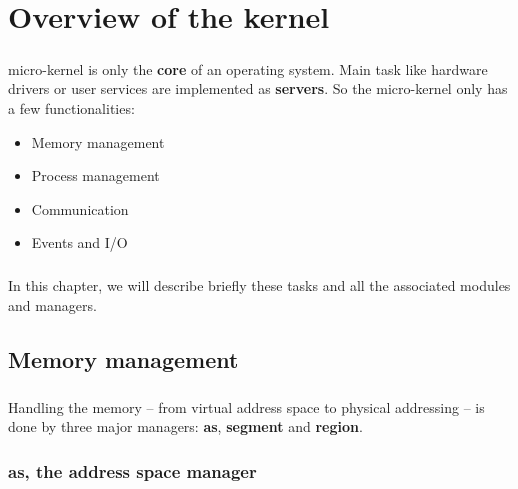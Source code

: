 
%
%

\chapter{Overview of the kernel}

\newpage

\paragraph{}
\kaneton micro-kernel is only the \textbf{core} of an operating system. Main task like hardware drivers or user services are implemented as \textbf{servers}. So the micro-kernel only has a few functionalities:\\

\begin{itemize}
\item Memory management
\item Process management
\item Communication
\item Events and I/O
\end{itemize}

\paragraph{}
In  this chapter, we  will describe  briefly these  tasks and  all the
associated modules and managers.

\section{Memory management}

\paragraph{}
Handling  the  memory  --  from  virtual  address  space  to  physical
addressing  --   is  done   by  three  major   managers:  \textbf{as},
\textbf{segment} and \textbf{region}.

\subsection*{as, the address space manager}

